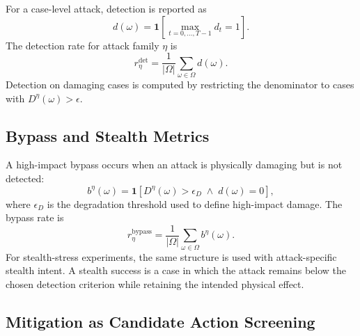 For a case-level attack, detection is reported as
\begin{equation}
    d(\omega)
    =
    \mathbf{1}
    \left[
        \max_{t=0,\ldots,T-1} d_t = 1
    \right].
    \label{eq:case_detection}
\end{equation}
The detection rate for attack family $\eta$ is
\begin{equation}
    r_{\eta}^{\mathrm{det}}
    =
    \frac{1}{|\Omega|}
    \sum_{\omega \in \Omega}
    d(\omega).
    \label{eq:detection_rate}
\end{equation}
Detection on damaging cases is computed by restricting the denominator to cases with $D^{\eta}(\omega)>\epsilon$.

\subsection{Bypass and Stealth Metrics}
\label{subsec:bypass_model}

A high-impact bypass occurs when an attack is physically damaging but is not detected:
\begin{equation}
    b^{\eta}(\omega)
    =
    \mathbf{1}
    \left[
        D^{\eta}(\omega) > \epsilon_D
        \;\land\;
        d(\omega)=0
    \right],
    \label{eq:bypass_indicator}
\end{equation}
where $\epsilon_D$ is the degradation threshold used to define high-impact damage. The bypass rate is
\begin{equation}
    r_{\eta}^{\mathrm{bypass}}
    =
    \frac{1}{|\Omega|}
    \sum_{\omega \in \Omega}
    b^{\eta}(\omega).
    \label{eq:bypass_rate}
\end{equation}
For stealth-stress experiments, the same structure is used with attack-specific stealth intent. A stealth success is a case in which the attack remains below the chosen detection criterion while retaining the intended physical effect.

\subsection{Mitigation as Candidate Action Screening}
\label{subsec:mitigation_model}

